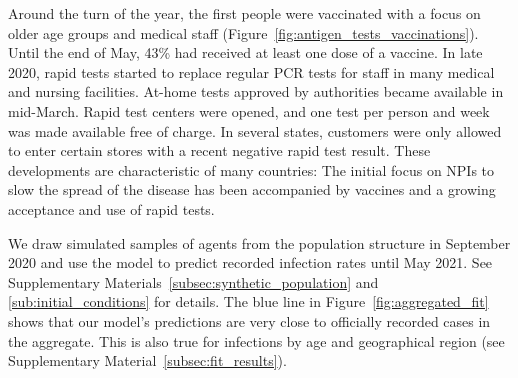 \begin{figure}[!tp]
\end{figure}

Around the turn of the year, the first people were vaccinated with a focus on older age
groups and medical staff (Figure~\ref{fig:antigen_tests_vaccinations}). Until the end of
May, 43\% had received at least one dose of a vaccine. In late 2020, rapid tests started
to replace regular PCR tests for staff in many medical and nursing facilities. At-home
tests approved by authorities became available in mid-March. Rapid test centers were
opened, and one test per person and week was made available free of charge. In several
states, customers were only allowed to enter certain stores with a recent negative rapid
test result. These developments are characteristic of many countries: The initial focus
on NPIs to slow the spread of the disease has been accompanied by vaccines and a growing
acceptance and use of rapid tests.

We draw simulated samples of agents from the population structure in September 2020 and
use the model to predict recorded infection rates until May 2021. See Supplementary
Materials~\ref{subsec:synthetic_population} and \ref{sub:initial_conditions} for
details. The blue line in Figure~\ref{fig:aggregated_fit} shows that our model's
predictions are very close to officially recorded cases in the aggregate. This is also
true for infections by age and geographical region (see Supplementary
Material~\ref{subsec:fit_results}).

